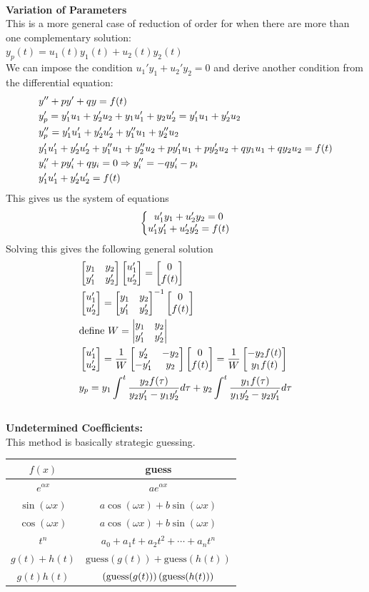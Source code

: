 \documentclass[11pt, fleqn]{article}
\begin{document}
\\
\textbf{Variation of Parameters}\\
This is a more general case of reduction of order for when there are more than one complementary solution:\\
$y_p(t)=u_1(t)y_1(t)+u_2(t)y_2(t)$\\
We can impose the condition $u_1'y_1+u_2'y_2=0$ and derive another condition from the differential equation:
\begin{align*}
    &y''+py'+qy=f(t)\\
    &y_p'=y_1'u_1+y_2'u_2+y_1u_1'+y_2u_2'=y_1'u_1+y_2'u_2\\
    &y_p''=y_1'u_1'+y_2'u_2'+y_1''u_1+y_2''u_2\\
    &y_1'u_1'+y_2'u_2'+y_1''u_1+y_2''u_2+py_1'u_1+py_2'u_2+qy_1u_1+qy_2u_2=f(t)\\
    &y_i''+py_i'+qy_i=0\Rightarrow y_i''=-qy_i'-p_i\\
    &y_1'u_1'+y_2'u_2'=f(t)
\end{align*}
This gives us the system of equations
$$\left\{\begin{matrix} u_1'y_1+u_2'y_2=0\\u_1'y_1'+u_2'y_2'=f(t) \end{matrix}\right.$$
Solving this gives the following general solution
\begin{align*}
    &\matrixx{y_1&y_2\\y_1'&y_2'}\matrixx{u_1'\\u_2'}=\matrixx{0\\f(t)}\\
    &\matrixx{u_1'\\u_2'}=\matrixx{y_1&y_2\\y_1'&y_2'}^{-1}\matrixx{0\\f(t)}\\
    &\text{define }W=\detmatrix{y_1&y_2\\y_1'&y_2'}\\
    &\matrixx{u_1'\\u_2'}=\frac{1}{W}\matrixx{y_2'&-y_2\\-y_1'&y_2}\matrixx{0\\f(t)}=\frac{1}{W}\matrixx{-y_2f(t)\\y_1f(t)}\\
    &y_p=y_1\int^t\frac{y_2f(\tau)}{y_2y_1'-y_1y_2'}d\tau+y_2\int^t\frac{y_1f(\tau)}{y_1y_2'-y_2y_1'}d\tau
\end{align*}\\
\textbf{Undetermined Coefficients:}\\
This method is basically strategic guessing.\\
\begin{tabular}{c|c}
    $f(x)$ & guess\\
    \hline
    $e^{\alpha x}$ & $ae^{\alpha x}$\\
    $\sin(\omega x)$ & $a\cos(\omega x)+b\sin(\omega x)$\\
    $\cos(\omega x)$ & $a\cos(\omega x)+b\sin(\omega x)$\\
    $t^n$ & $a_0+a_1t+a_2t^2+\cdots+a_nt^n$\\
    $g(t)+h(t)$ & $\text{guess}(g(t))+\text{guess}(h(t))$\\
    $g(t)h(t)$ & $\left( \text{guess}(g(t)) \right)\left( \text{guess}(h(t)) \right)$
\end{tabular}\\
\end{document}
